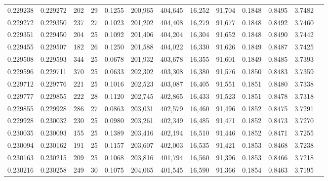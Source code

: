\begin{tabular}{rrrrrrrrrrrrr}
0.229238 & 0.229272 &   202 &  29 &                                     0.1255 & 200,965 & 404,645 &  16,252 &  91,704 & 0.1848 & 0.8495 & 3.7482 \\
0.229272 & 0.229350 &   237 &  27 &                                     0.1023 & 201,202 & 404,408 &  16,279 &  91,677 & 0.1848 & 0.8492 & 3.7460 \\
0.229351 & 0.229450 &   204 &  25 &                                     0.1092 & 201,406 & 404,204 &  16,304 &  91,652 & 0.1848 & 0.8490 & 3.7442 \\
0.229455 & 0.229507 &   182 &  26 &                                     0.1250 & 201,588 & 404,022 &  16,330 &  91,626 & 0.1849 & 0.8487 & 3.7425 \\
0.229508 & 0.229593 &   344 &  25 &                                     0.0678 & 201,932 & 403,678 &  16,355 &  91,601 & 0.1849 & 0.8485 & 3.7393 \\
0.229596 & 0.229711 &   370 &  25 &                                     0.0633 & 202,302 & 403,308 &  16,380 &  91,576 & 0.1850 & 0.8483 & 3.7359 \\
0.229712 & 0.229776 &   221 &  25 &                                     0.1016 & 202,523 & 403,087 &  16,405 &  91,551 & 0.1851 & 0.8480 & 3.7338 \\
0.229777 & 0.229855 &   222 &  28 &                                     0.1120 & 202,745 & 402,865 &  16,433 &  91,523 & 0.1851 & 0.8478 & 3.7318 \\
0.229855 & 0.229928 &   286 &  27 &                                     0.0863 & 203,031 & 402,579 &  16,460 &  91,496 & 0.1852 & 0.8475 & 3.7291 \\
0.229928 & 0.230032 &   230 &  25 &                                     0.0980 & 203,261 & 402,349 &  16,485 &  91,471 & 0.1852 & 0.8473 & 3.7270 \\
0.230035 & 0.230093 &   155 &  25 &                                     0.1389 & 203,416 & 402,194 &  16,510 &  91,446 & 0.1852 & 0.8471 & 3.7255 \\
0.230094 & 0.230162 &   191 &  25 &                                     0.1157 & 203,607 & 402,003 &  16,535 &  91,421 & 0.1853 & 0.8468 & 3.7238 \\
0.230163 & 0.230215 &   209 &  25 &                                     0.1068 & 203,816 & 401,794 &  16,560 &  91,396 & 0.1853 & 0.8466 & 3.7218 \\
0.230216 & 0.230258 &   249 &  30 &                                     0.1075 & 204,065 & 401,545 &  16,590 &  91,366 & 0.1854 & 0.8463 & 3.7195 \\

\end{tabular}
